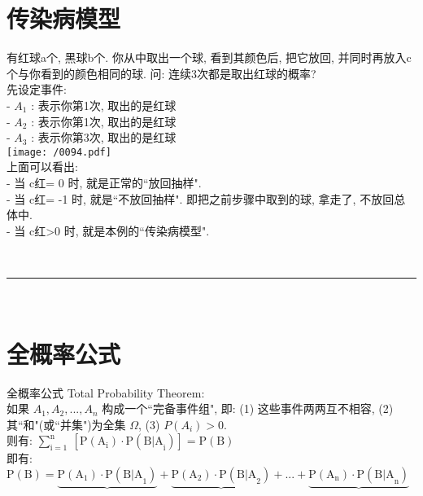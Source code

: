 \documentclass[UTF8]{ctexart}
\begin{document}
\section{传染病模型}


\begin{myEnvSample}
	有红球a个, 黑球b个. 你从中取出一个球, 看到其颜色后, 把它放回, 并同时再放入c个与你看到的颜色相同的球. 	问:  连续3次都是取出红球的概率? \\
	先设定事件: \\
	- $A_1$ : 表示你第1次, 取出的是红球 \\
	- $A_2$ : 表示你第1次, 取出的是红球 \\	
	- $A_3$ : 表示你第3次, 取出的是红球 \\	
	
	\texttt{[image: /0094.pdf]} \\
	
	上面可以看出: \\
	- 当 c红= 0 时, 就是正常的``放回抽样". \\
	- 当 c红= -1 时, 就是``不放回抽样". 即把之前步骤中取到的球, 拿走了, 不放回总体中. \\
	- 当 c红>0 时, 就是本例的``传染病模型".	
\end{myEnvSample}



~\\
\hrule
~\\

	
	\section{全概率公式}
	
	全概率公式 Total Probability Theorem: \\	
	如果 $A_1, A_2, ..., A_n$ 构成一个``完备事件组", 即: (1) 这些事件两两互不相容,  (2)其``和"(或``并集")为全集 $\Omega$, (3) $P(A_i)>0$. \\
		
	则有:
$\boxed{
\sum_{\text{i}=1}^{\text{n}}{\ \left[ \text{P}\left( \text{A}_{\text{i}} \right) \cdot \text{P}\left( \text{B|A}_{\text{i}} \right) \right]}=\text{P}\left( \text{B} \right) 
}
$ \\

即有: $
\text{P}\left( \text{B} \right) =\underbrace{\text{P}\left( \text{A}_1 \right) \cdot \text{P}\left( \text{B|A}_1 \right) }+\underbrace{\text{P}\left( \text{A}_2 \right) \cdot \text{P}\left( \text{B|A}_2 \right) }+...+\underbrace{\text{P}\left( \text{A}_{\text{n}} \right) \cdot \text{P}\left( \text{B|A}_{\text{n}} \right) }
$ \\
\end{document}

